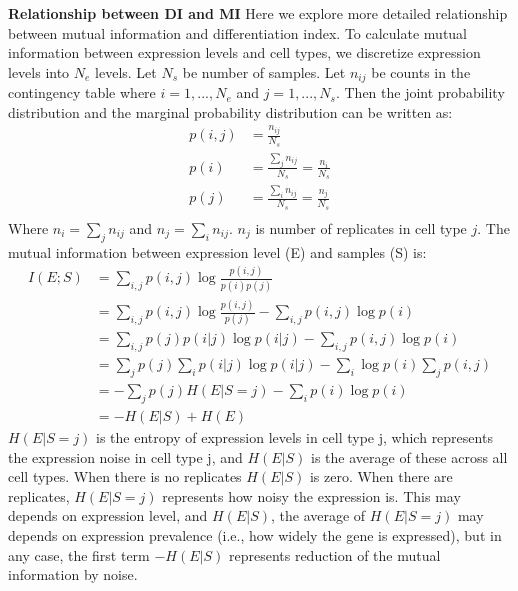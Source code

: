 \textbf{Relationship between DI and MI} 
Here we explore more detailed relationship between mutual information and differentiation index. To calculate mutual information between expression levels and cell types, we discretize expression levels into $N_{e}$ levels. Let $N_{s}$ be number of samples. Let $n_{ij}$ be counts in the contingency table where $i=1,...,N_{e}$ and $j=1,...,N_{s}$. Then the joint probability distribution and the marginal probability distribution can be written as:
\begin{align}
p(i,j) &= \frac{n_{ij}}{N_{s}} \\
p(i) &= \frac{\sum_{j}{n_{ij}}}{N_{s}} = \frac{n_i}{N_s} \\
p(j) &= \frac{\sum_{i}{n_{ij}}}{N_{s}} = \frac{n_j}{N_s}\\
\end{align}
Where $n_i = \sum_{j}{n_{ij}}$ and $n_j=\sum_{i}n_{ij}$. $n_j$ is number of replicates in cell type $j$. The mutual information between expression level (E) and samples (S) is:
\begin{align}
I(E;S) &= \sum_{i,j}{p(i,j)\log\frac{p(i,j)}{p(i)p(j)}} \\
       &= \sum_{i,j}{p(i,j)\log\frac{p(i,j)}{p(j)}}-\sum_{i,j}p(i,j)\log{p(i)}  \\
       &= \sum_{i,j}p(j)p(i|j)\log{p(i|j)}-\sum_{i,j}p(i,j)\log{p(i)}  \\
       &= \sum_{j}p(j)\sum_{i}p(i|j)\log{p(i|j)}-\sum_{i}\log{p(i)}\sum_{j}p(i,j)  \\
       &= -\sum_{j}p(j)H(E|S=j)-\sum_{i}p(i)\log{p(i)}  \\
       &= -H(E|S)+H(E)
\end{align}
$H(E|S=j)$ is the entropy of expression levels in cell type j, which represents the expression noise in cell type j, and $H(E|S)$ is the average of these across all cell types. When there is no replicates $H(E|S)$ is zero. When there are replicates, $H(E|S=j)$ represents how noisy the expression is. This may depends on expression level, and $H(E|S)$, the average of $H(E|S=j)$ may depends on expression prevalence (i.e., how widely the gene is expressed), but in any case, the first term $-H(E|S)$ represents reduction of the mutual information by noise. 

